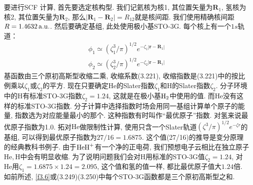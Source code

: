 要进行SCF
计算, 首先要选定核构型. 我们记氦核为核1, 其位置矢量为$\mathbf{R}_1$, 氢核为核2, 其位置矢量为$\mathbf{R}_2$, 那么$|\mathbf{R}_1-\mathbf{R}_2|=R_{12}$就是核间距. 我们使用精确核间距$R=1.4632\,\mathrm{a.u.}$. 然后要确定基组, 此处使用极小基STO-3G. 每个核上有一个$1s$轨道：
\begin{align}
\phi_1 \simeq (\zeta_1^3/\pi)^{1/2} e^{-\zeta_1|\mathbf{r-R}_1|}\\
\phi_2 \simeq (\zeta_2^3/\pi)^{1/2} e^{-\zeta_2|\mathbf{r-R}_1|}
\end{align}
基函数由三个原初高斯型收缩二乘, 收缩系数(3.221), 收缩指数是(3.221)中的按比例乘以$\zeta_1$或$\zeta_2$的平方. 现在只要确定$\mathrm{He}$的Slater指数$\zeta_1$和$\mathrm{H}$的Slater指数$\zeta_2$. 分子环境中的$\mathrm{H}$有标准STO-3G指数$\zeta_2=1.24$, 这就是在极小基$\mathrm{H}_2$中使用的值. 而$\mathrm{He}$没有这样的标准STO-3G指数. 分子计算中选择指数时场会用同一基组计算单个原子的能量, 指数选为对应能量最小的那个. 这种指数有时叫作``最优原子''指数. 对氢来说最优原子指数为1.0. 拓对$\mathrm{He}$做限制性\hft 计算, 使用只含一个Slater轨道$(\zeta^3/\pi)^{1/2}e^{-\zeta r}$的基组, 可以得到最优原子指数为$27/16=1.6875$. 这个值(27/16)的推导是变分原理的经典教科书例子. 由于$\mathrm{HeH}^+$有一个净的正电荷, 我们预想电子云相比在独立原子$\mathrm{He,H}$中会有明显收缩. 为了说明问题我们会对$\mathrm{H}$用标准的STO-3G值$\zeta_2=1.24$, 对$\mathrm{He}$用$\zeta_1=1.6875\times 1.24=2.095$, 这个值和氢的值一样, 都比最优原子值大$1.24$倍. 如前所述, \ref{f3.6}或(3.249)(3.250)中每个STO-3G函数都是三个原初高斯型之和.

